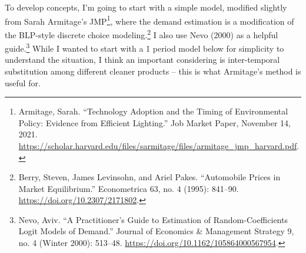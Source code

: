 \documentclass[12pt]{article}
\begin{document}
To develop concepts, I'm going to start with a simple model, modified slightly from Sarah Armitage's JMP\footnote{Armitage, Sarah. “Technology Adoption and the Timing of Environmental Policy: Evidence from Eﬃcient Lighting.” Job Market Paper, November 14, 2021. \url{https://scholar.harvard.edu/files/sarmitage/files/armitage_jmp_harvard.pdf}.}, where the demand estimation is a modification of the BLP-style discrete choice modeling.\footnote{Berry, Steven, James Levinsohn, and Ariel Pakes. “Automobile Prices in Market Equilibrium.” Econometrica 63, no. 4 (1995): 841–90. \url{https://doi.org/10.2307/2171802}.} I also use Nevo (2000) as a helpful guide.\footnote{Nevo, Aviv. “A Practitioner’s Guide to Estimation of Random-Coefficients Logit Models of Demand.” Journal of Economics \& Management Strategy 9, no. 4 (Winter 2000): 513–48. \url{https://doi.org/10.1162/105864000567954}.} While I wanted to start with a 1 period model below for simplicity to understand the situation, I think an important considering is inter-temporal substitution among different cleaner products -- this is what Armitage's method is useful for.
\end{document}

